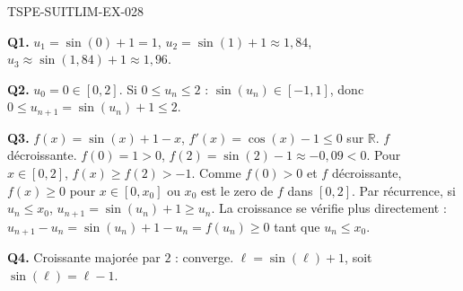 \begin{corrige}{TSPE-SUITLIM-EX-028}

\textbf{Q1.} $u_1 = \sin(0)+1 = 1$, $u_2 = \sin(1)+1 \approx 1{,}84$, $u_3 \approx \sin(1{,}84)+1 \approx 1{,}96$.

\textbf{Q2.} $u_0=0 \in [0,2]$. Si $0 \leq u_n \leq 2$ : $\sin(u_n) \in [-1,1]$, donc $0 \leq u_{n+1} = \sin(u_n)+1 \leq 2$.

\textbf{Q3.} $f(x) = \sin(x)+1-x$, $f'(x) = \cos(x)-1 \leq 0$ sur $\mathbb{R}$. $f$ décroissante. $f(0)=1>0$, $f(2)=\sin(2)-1 \approx -0{,}09 < 0$. Pour $x \in [0,2]$, $f(x) \geq f(2) > -1$. Comme $f(0)>0$ et $f$ décroissante, $f(x) \geq 0$ pour $x \in [0, x_0]$ ou $x_0$ est le zero de $f$ dans $[0,2]$. Par récurrence, si $u_n \leq x_0$, $u_{n+1} = \sin(u_n)+1 \geq u_n$. La croissance se vérifie plus directement : $u_{n+1}-u_n = \sin(u_n)+1-u_n = f(u_n) \geq 0$ tant que $u_n \leq x_0$.

\textbf{Q4.} Croissante majorée par $2$ : converge. $\ell = \sin(\ell)+1$, soit $\boxed{\sin(\ell) = \ell - 1}$.

\end{corrige}

